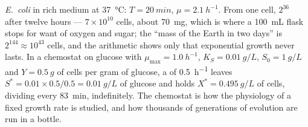 \begin{example}\label{ex:b3:bacteriology:numbers}
\emph{E.~coli} in rich medium at \qty{37}{\celsius}: $T = \qty{20}{min}$,
$\mu = \qty{2.1}{h^{-1}}$. From one cell, $2^{36}$ after twelve hours
--- $7\times 10^{10}$ cells, about \qty{70}{mg}, which is where a
\qty{100}{mL} flask stops for want of oxygen and sugar; the ``mass of
the Earth in two days'' is $2^{144}\approx 10^{43}$ cells, and the
arithmetic shows only that exponential growth never lasts. In a
chemostat on glucose with $\mu_{\max} = \qty{1.0}{h^{-1}}$, $K_{S} =
\qty{0.01}{g/L}$, $S_{0} = \qty{1}{g/L}$ and $Y = \qty{0.5}{g}$ of cells
per gram of glucose, a  of \qty{0.5}{h^{-1}} leaves $S^{*}
= 0.01\times 0.5/0.5 = \qty{0.01}{g/L}$ of glucose and holds $X^{*} =
\qty{0.495}{g/L}$ of cells, dividing every \qty{83}{min}, indefinitely.
The chemostat is how the physiology of a fixed growth rate is studied,
and how thousands of generations of evolution are run in a bottle.
\end{example}

